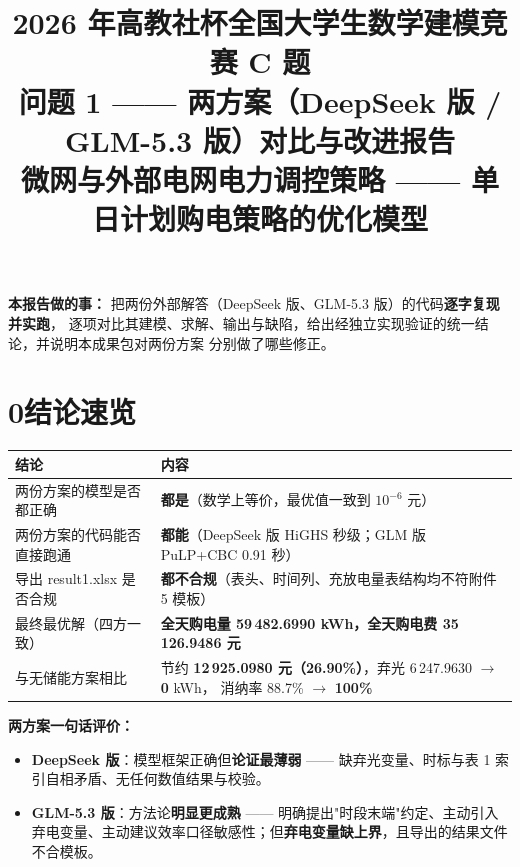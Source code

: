 \documentclass[12pt,a4paper]{ctexart}
\title{\bfseries 2026 年高教社杯全国大学生数学建模竞赛 C 题\\[4pt]
问题 1 —— 两方案（DeepSeek 版 / GLM-5.3 版）对比与改进报告\\[6pt]
\large 微网与外部电网电力调控策略 —— 单日计划购电策略的优化模型}
\author{}
\date{}
\begin{document}
\maketitle
\vspace{-2.2cm}

\begin{center}
\begin{minipage}{0.93\textwidth}
\small
\textbf{本报告做的事：} 把两份外部解答（DeepSeek 版、GLM-5.3 版）的代码\textbf{逐字复现并实跑}，
逐项对比其建模、求解、输出与缺陷，给出经独立实现验证的统一结论，并说明本成果包对两份方案
分别做了哪些修正。
\end{minipage}
\end{center}

\section*{0\quad 结论速览}

\begin{center}
\begin{tabular}{@{}p{5.0cm} p{10.2cm}@{}}
\toprule
结论 & 内容 \\
\midrule
两份方案的模型是否都正确 & \textbf{都是}（数学上等价，最优值一致到 $10^{-6}$ 元）\\
两份方案的代码能否直接跑通 & \textbf{都能}（DeepSeek 版 HiGHS 秒级；GLM 版 PuLP+CBC 0.91 秒）\\
导出 result1.xlsx 是否合规 & \textbf{都不合规}（表头、时间列、充放电量表结构均不符附件 5 模板）\\
最终最优解（四方一致） & \textbf{全天购电量 59\,482.6990 kWh，全天购电费 35\,126.9486 元}\\
与无储能方案相比 & 节约 \textbf{12\,925.0980 元（26.90\%）}，弃光 6\,247.9630 $\to$ \textbf{0} kWh，
                     消纳率 88.7\% $\to$ \textbf{100\%}\\
\bottomrule
\end{tabular}
\end{center}

\textbf{两方案一句话评价：}
\begin{itemize}
  \item \textbf{DeepSeek 版}：模型框架正确但\textbf{论证最薄弱} —— 缺弃光变量、时标与表 1 索引自相矛盾、无任何数值结果与校验。
  \item \textbf{GLM-5.3 版}：方法论\textbf{明显更成熟} —— 明确提出"时段末端"约定、主动引入弃电变量、主动建议效率口径敏感性；但\textbf{弃电变量缺上界}，且导出的结果文件不合模板。
\end{itemize}
\end{document}
